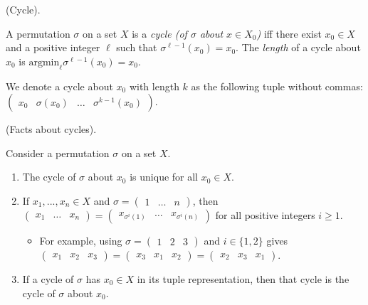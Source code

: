 \begin{defn}
    (Cycle).

    A permutation $\sigma$ on a set $X$ is a \textit{cycle (of $\sigma$ about $x \in X_0$)} iff there exist $x_0 \in X$ and a positive integer $\ell$ such that $\sigma^{\ell - 1}(x_0) = x_0$. The \textit{length} of a cycle about $x_0$ is $\text{argmin}_\ell \sigma^{\ell - 1}(x_0) = x_0$.
    
    We denote a cycle about $x_0$ with length $k$ as the following tuple without commas: $\begin{pmatrix} x_0 & \sigma(x_0) & \hdots & \sigma^{k - 1}(x_0) \end{pmatrix}$.
\end{defn}

\begin{lemma}
    (Facts about cycles).
    
    Consider a permutation $\sigma$ on a set $X$.
    
    \begin{enumerate}
        \item The cycle of $\sigma$ about $x_0$ is unique for all $x_0 \in X$.
        \item If $x_1, ..., x_n \in X$ and $\sigma = \begin{pmatrix} 1 & \hdots & n \end{pmatrix}$, then $\begin{pmatrix} x_1 & \hdots & x_n \end{pmatrix} = \begin{pmatrix} x_{\sigma^i(1)} & \hdots & x_{\sigma^i(n)} \end{pmatrix}$ for all positive integers $i \geq 1$.
        \begin{itemize}
            \item For example, using $\sigma = \begin{pmatrix}
            1 & 2 & 3 \end{pmatrix}$ and $i \in \{1, 2\}$ gives $\begin{pmatrix} x_1 & x_2 & x_3 \end{pmatrix} = \begin{pmatrix} x_3 & x_1 & x_2 \end{pmatrix} = \begin{pmatrix} x_2 & x_3 & x_1 \end{pmatrix}$.
        \end{itemize}
        \item If a cycle of $\sigma$ has $x_0 \in X$ in its tuple representation, then that cycle is the cycle of $\sigma$ about $x_0$.
    \end{enumerate}
\end{lemma}

